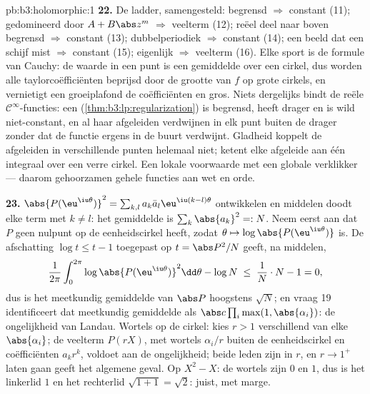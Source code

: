\begin{solution}{pb:b3:holomorphic:1}
\textbf{22.} De ladder, samengesteld: begrensd $\Rightarrow$
constant (11); gedomineerd door $A + B\abs z^m$ $\Rightarrow$
veelterm (12); reëel deel naar boven begrensd $\Rightarrow$
constant (13); dubbelperiodiek $\Rightarrow$ constant (14); een
beeld dat een schijf mist $\Rightarrow$ constant (15); eigenlijk
$\Rightarrow$ veelterm (16). Elke sport is de formule van Cauchy:
de waarde in een punt is een gemiddelde over een cirkel, dus
worden alle taylorcoëfficiënten beprijsd door de grootte van $f$
op grote cirkels, en vernietigt een groeiplafond de coëfficiënten
en gros. Niets dergelijks bindt de reële $\mathcal
C^\infty$-functies: een 
(\cref{thm:b3:lp:regularization}) is begrensd, heeft 
drager en is wild niet-constant, en al haar afgeleiden verdwijnen
in elk punt buiten de drager zonder dat de functie ergens in de
buurt verdwijnt. Gladheid koppelt de afgeleiden in verschillende
punten helemaal niet;  ketent elke afgeleide aan één
integraal over een verre cirkel. Een lokale voorwaarde met een
globale verklikker --- daarom gehoorzamen gehele functies aan wet
en orde.

\textbf{23.} $\abs{P(\eu^{\iu\theta})}^2 = \sum_{k,l}a_k\bar a_l
\eu^{\iu(k-l)\theta}$ ontwikkelen en middelen doodt elke term met
$k \neq l$: het gemiddelde is $\sum_k\abs{a_k}^2 =: N$. Neem
eerst aan dat $P$ geen nulpunt op de eenheidscirkel heeft, zodat
$\theta \mapsto \log\abs{P(\eu^{\iu\theta})}$  is. De
afschatting $\log t \leq t - 1$ toegepast op $t = \abs P^2/N$
geeft, na middelen,
\[
\frac1{2\pi}\int_0^{2\pi}\log\abs{P(\eu^{\iu\theta})}^2
\dd\theta - \log N
\;\leq\; \frac1N\cdot N - 1 = 0,
\]
dus is het meetkundig gemiddelde van $\abs P$ hoogstens $\sqrt
N$; en vraag 19 identificeert dat meetkundig gemiddelde als $\abs
c\prod_i\max(1, \abs{\alpha_i})$: de ongelijkheid van Landau.
Wortels op de cirkel: kies $r > 1$ verschillend van elke
$\abs{\alpha_i}$; de veelterm $P(rX)$, met wortels $\alpha_i/r$
buiten de eenheidscirkel en coëfficiënten $a_kr^k$, voldoet aan
de ongelijkheid; beide leden zijn  in $r$, en $r \to 1^+$
laten gaan geeft het algemene geval. Op $X^2 - X$: de wortels
zijn $0$ en $1$, dus is het linkerlid $1$ en het rechterlid
$\sqrt{1 + 1} = \sqrt2$: juist, met marge.


\end{solution}

